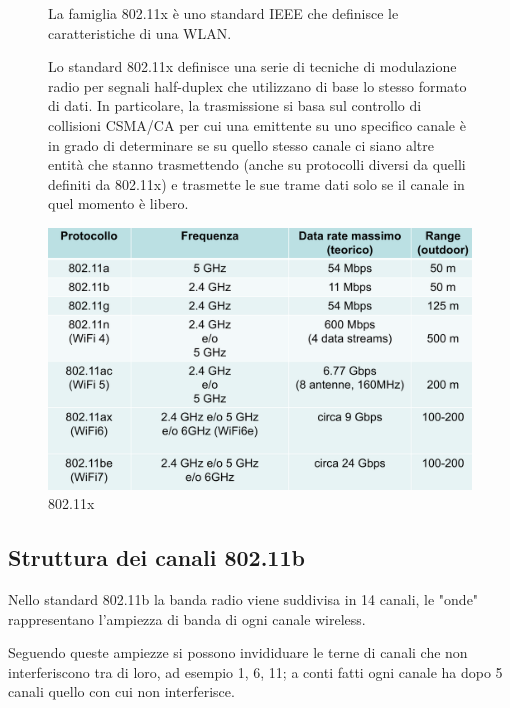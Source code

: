 \begin{figure}[htbp]
    \centering
    \begin{minipage}{0.45\textwidth}
        La famiglia 802.11x è uno standard IEEE che definisce le caratteristiche di una WLAN.

        Lo standard 802.11x definisce una serie di tecniche di modulazione radio per segnali half-duplex che utilizzano di base lo stesso formato di dati. In particolare, la trasmissione si basa sul controllo di collisioni CSMA/CA per cui una emittente su uno specifico canale è in grado di determinare se su quello stesso canale ci siano altre entità che stanno trasmettendo (anche su protocolli diversi da quelli definiti da 802.11x) e trasmette le sue trame dati solo se il canale in quel momento è libero.
    \end{minipage}
        \hfill
    \begin{minipage}{0.53\textwidth}
        \includegraphics[width=\linewidth]{images/famigliaieee802.png}
        \caption{802.11x}
    \end{minipage}
\end{figure}

\subsection{Struttura dei canali 802.11b}
Nello standard 802.11b la banda radio viene suddivisa in 14 canali, le "onde" rappresentano l'ampiezza di banda di ogni canale wireless.

Seguendo queste ampiezze si possono invididuare le terne di canali che non interferiscono tra di loro, ad esempio 1, 6, 11; a conti fatti ogni canale ha dopo 5 canali quello con cui non interferisce.

